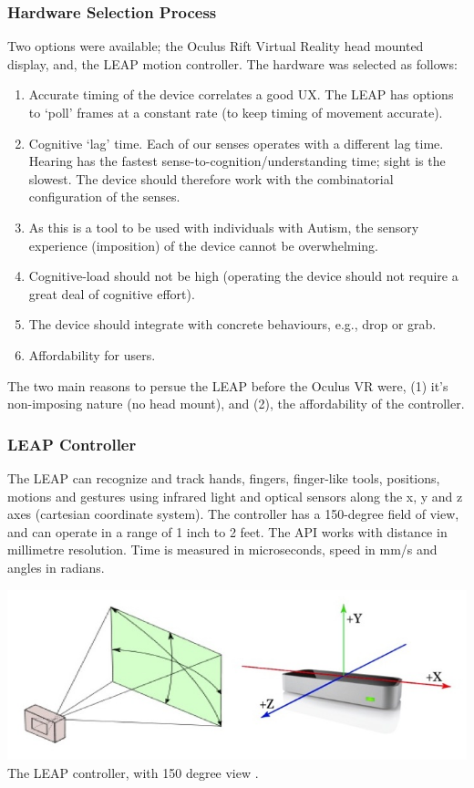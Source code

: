 \documentclass[a4paper, 11pt]{article}
\begin{document}
\subsubsection{Hardware Selection Process}
Two options were available; the Oculus Rift Virtual Reality head mounted display, and, the LEAP motion controller. The hardware was selected as follows: 
\begin{enumerate}
\item Accurate timing of the device correlates a good UX. The LEAP has options to ‘poll’ frames at a constant rate (to keep timing of movement accurate).
\item Cognitive ‘lag’ time. Each of our senses operates with a different lag time. Hearing has the fastest sense-to-cognition/understanding time; sight is the slowest. The device should therefore work with the combinatorial configuration of the senses.
\item As this is a tool to be used with individuals with Autism, the sensory experience (imposition) of the device cannot be overwhelming.
\item Cognitive-load should not be high (operating the device should not require a great deal of cognitive effort).
\item The device should integrate with concrete behaviours, e.g., drop or grab. 
\item Affordability for users.
\end{enumerate}
The two main reasons to persue the LEAP before the Oculus VR were, (1) it's non-imposing nature (no head mount), and (2), the affordability of the controller.

\subsubsection{LEAP Controller}
The LEAP can recognize and track hands, fingers, finger-like tools, positions, motions and gestures using infrared light and optical sensors along the x, y and z axes (cartesian coordinate system). The controller has a 150-degree field of view, and can operate in a range of 1 inch to 2 feet. The API works with distance in millimetre resolution. Time is measured in microseconds, speed in mm/s and angles in radians.

\begin{center}
\includegraphics[scale=0.5]{leap}\\
The LEAP controller, with 150 degree view \cite{leap}.
\end{center}
\end{document}
